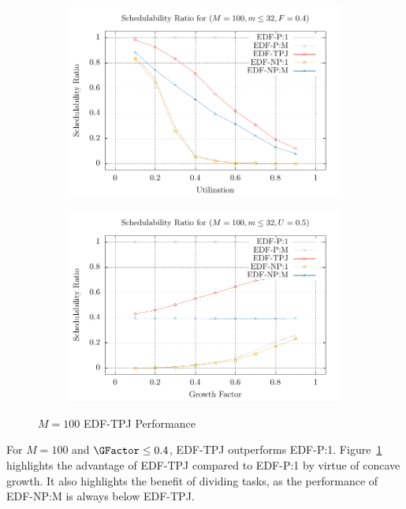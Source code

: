 \begin{figure}[ht]
  \centering
  \begin{subfigure}[t]{\cwidth}
    \includegraphics[width=\linewidth]{plot/2D-UFS/2D-M100m32F0_4xS}%
  \end{subfigure}%
  \begin{subfigure}[t]{\cwidth}
    \includegraphics[width=\linewidth]{plot/2D-UFS/2D-M100m32U0_5xS}%
  \end{subfigure}%
  \caption{${M = 100}$ EDF-TPJ Performance}
  \label{fig:m100-tpj}
\end{figure}


For ${M = 100}$ and ${\GFactor \le 0.4}$, EDF-TPJ outperforms
EDF-P:1. Figure~\ref{fig:m100-tpj} highlights the advantage of
EDF-TPJ compared to EDF-P:1 by virtue of concave growth. It also
highlights the benefit of dividing tasks, as the performance of
EDF-NP:M is always below EDF-TPJ.


